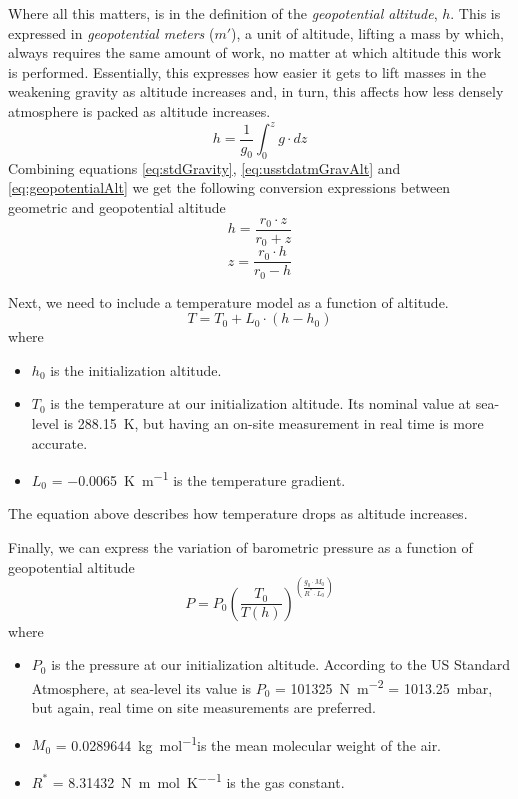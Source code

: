 Where all this matters, is in the definition of the \emph{geopotential altitude}, $h$. This is expressed in \emph{geopotential meters} ($m'$), a unit of altitude, lifting a mass by which, always requires the same amount of work, no matter at which altitude this work is performed. Essentially, this expresses how easier it gets to lift masses in the weakening gravity as altitude increases and, in turn, this affects how less densely atmosphere is packed as altitude increases.
\begin{equation} \label{eq:geopotentialAlt}
	h = \frac{1}{g_0}\int_{0}^{z}g\cdot dz
\end{equation}
Combining equations \ref{eq:stdGravity}, \ref{eq:usstdatmGravAlt} and \ref{eq:geopotentialAlt} we get the following conversion expressions between geometric and geopotential altitude
\begin{equation}
	h = \frac{r_0 \cdot z}{r_0 + z}
\end{equation}
\begin{equation}
	z = \frac{r_0 \cdot h}{r_0 - h}
\end{equation}

Next, we need to include a temperature model as a function of altitude.
\begin{equation}
	T = T_0 + L_0 \cdot (h - h_0)
\end{equation}
where
\begin{itemize}
	\item $h_0$ is the initialization altitude.
	\item $T_0$ is the temperature at our initialization altitude. Its nominal value at sea-level is \SI{288.15}{\kelvin}, but having an on-site measurement in real time is more accurate.
	\item $L_0$ = \SI{-0.0065}{\kelvin\per\meter} is the temperature gradient.
\end{itemize}
The equation above describes how temperature drops as altitude increases.

Finally, we can express the variation of barometric pressure as a function of geopotential altitude
\begin{equation}
	P = P_0\left( \frac{T_{0}}{T(h)} \right) ^ {\left( \frac{g_0 \cdot M_0}{R^* \cdot L_{0}} \right)}
\end{equation}
where
\begin{itemize}
	\item $P_0$ is the pressure at our initialization altitude. According to the US Standard Atmosphere, at sea-level its value is $P_0$ = \SI{101325}{\newton\per\square\meter} = \SI{1013.25}{\milli\bar}, but again, real time on site measurements are preferred.
	\item $M_0$ = \SI{0.0289644}{\kilogram\per\mole}is the mean molecular weight of the air.
	\item $R^*$ = \SI{8.31432}{\newton\meter\per\mole\per\kelvin} is the gas constant.
\end{itemize}

